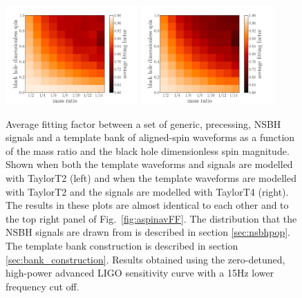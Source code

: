 \begin{figure}
    \centering 
    \begin{minipage}[l]{2.0\columnwidth}
    \centering
\includegraphics[width=0.45\textwidth]
{papers/nsbh_effectualness/figure14A.pdf}
\includegraphics[width=0.45\textwidth]
{papers/nsbh_effectualness/figure14B.pdf}
\caption{\label{fig:aspinavFFT2}
Average fitting factor between a set of generic, precessing, NSBH
signals and a template bank of aligned-spin waveforms as a function of the
mass ratio and the black hole dimensionless spin magnitude. Shown when both the
template waveforms and signals are modelled with TaylorT2 (left) and when the
template waveforms are modelled with TaylorT2 and the signals are modelled with
TaylorT4 (right). The results in these plots are almost identical to each other 
and to the top right panel of Fig.~\ref{fig:aspinavFF}.
The distribution that the NSBH
signals are drawn from is described in section \ref{sec:nsbhpop}. The
template bank construction is described in section \ref{sec:bank_construction}.
Results obtained
using the zero-detuned, high-power advanced LIGO sensitivity curve with a 15Hz
lower frequency cut off.
}
\end{minipage}
\end{figure}


